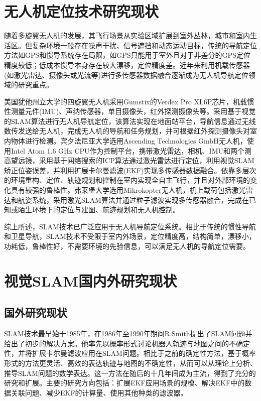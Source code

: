 \section{无人机定位技术研究现状}
随着多旋翼无人机的发展，其飞行场景从实验区域扩展到室外丛林，城市和室内生活区。但复杂环境一般存在噪声干扰、信号遮挡和动态运动目标，传统的导航定位方法如GPS和惯导系统存在局限，如GPS只能用于室外且对于非差分的GPS定位精度较低；低成本惯导本身存在较大漂移，定位精度差。近年来利用机载传感器(如激光雷达、摄像头或光流等)进行多传感器数据融合逐渐成为无人机导航定位领域的研究重点。

美国犹他州立大学\upcite{[1.4]}的四旋翼无人机采用Gumstix的Verdex Pro XL6P芯片，机载惯性测量元件(IMU)、声纳传感器，单目摄像头，红外探测摄像头等。采用基于视觉的SLAM算法进行无人机导航定位，该算法实现在地面站平台，导航信息通过无线数传发送给无人机，完成无人机的导航和任务规划，并可根据红外探测摄像头对室内物体进行检测。宾夕法尼亚大学\upcite{[1.5]}选用Ascending Technologies GmbH无人机，使用Intel Atom 1.6 GHz CPU作为控制平台，携带激光雷达，相机、IMU和两个测高望远镜，采用基于网络搜索的ICP算法通过激光雷达进行定位，利用视觉SLAM矫正位姿误差，并利用扩展卡尔曼滤波(EKF)实现多传感器数据融合。依靠多层次的环境重构、定位、轨迹规划和控制在室内实现全自主飞行，并且对外部环境的变化具有较强的鲁棒性。弗莱堡大学\upcite{[1.6]}选用Mikrokopter无人机，机上载荷包括激光雷达和航姿系统，采用激光SLAM算法并通过粒子滤波实现多传感器融合，完成在已知或陌生环境下的定位与建图、航迹规划和无人机控制。

综上所述，SLAM技术已广泛应用于无人机导航定位系统。相比于传统的惯性导航和卫星导航，SLAM技术不受限于室内外场景，定位精度高，结构简单，漂移小，功耗低，鲁棒性好，不需要环境的先验信息，可以满足无人机的导航定位需要。

\section{视觉SLAM国内外研究现状}
\subsection{国外研究现状}
SLAM技术最早始于1985年\upcite{[1.7]}，在1986年至1990年期间R.Smith提出了SLAM问题并给出了初步的解决方案\upcite{[1.8]}。他率先以概率形式讨论机器人轨迹与地图之间的不确定性，并将扩展卡尔曼滤波应用在SLAM问题。相比于之前的确定性方法，基于概率形式的方法更灵活、高效的表达轨迹与地图的不确定性，从而可以从理论上分析、推导SLAM问题的数学表达。这一方法在随后的十几年间成为主流，得到了充分的研究和扩展\upcite{[1.9],[1.10]}。主要的研究方向包括：扩展EKF应用场景的规模\upcite{[1.11],[1.12]}、解决EKF中的数据关联问题\upcite{[1.13]}、减少EKF的计算量\upcite{[1.14]}、使用其他种类的滤波器\upcite{[1.15],[1.16]}。

